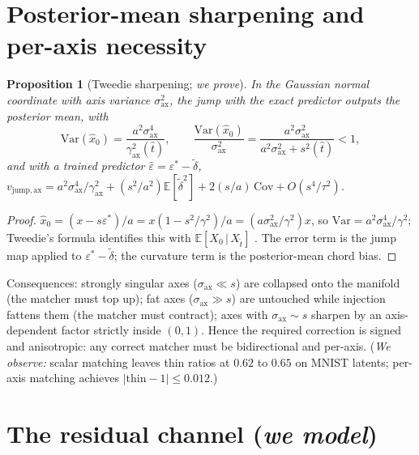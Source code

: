 \documentclass[11pt]{article}
\newtheorem{proposition}{Proposition}
\theoremstyle{remark}
\newcommand{\eps}{\varepsilon}
\newcommand{\epshat}{\hat\varepsilon}
\newcommand{\E}{\mathbb{E}}
\newcommand{\Var}{\mathrm{Var}}
\begin{document}
\section{Posterior-mean sharpening and per-axis necessity}\label{app:sharpening}

\begin{proposition}[Tweedie sharpening; \emph{we prove}]\label{prop:sharpening}
In the Gaussian normal coordinate with axis variance $\sigma^2_{\mathrm{ax}}$, the jump
with the exact predictor outputs the posterior mean, with
\[
\Var(\hat x_0)=\frac{a^2\sigma^4_{\mathrm{ax}}}{\gamma^2_{\mathrm{ax}}(\hat t)},\qquad
\frac{\Var(\hat x_0)}{\sigma^2_{\mathrm{ax}}}
=\frac{a^2\sigma^2_{\mathrm{ax}}}{a^2\sigma^2_{\mathrm{ax}}+s^2(\hat t)}<1 ,
\]
and with a trained predictor $\epshat=\eps^*-\tilde\delta$,
$v_{\mathrm{jump,ax}}=a^2\sigma^4_{\mathrm{ax}}/\gamma^2_{\mathrm{ax}}
+(s^2/a^2)\E[\tilde\delta^2]+2(s/a)\,\mathrm{Cov}+O(s^4/\tau^2)$.
\end{proposition}

\begin{proof}
$\hat x_0=(x-s\eps^*)/a=x(1-s^2/\gamma^2)/a=(a\sigma^2_{\mathrm{ax}}/\gamma^2)x$, so
$\Var=a^2\sigma^4_{\mathrm{ax}}/\gamma^2$; Tweedie's formula identifies this with
$\E[X_0\,|\,X_{\hat t}]$ \citep{efron2011tweedie}. The error term is the jump map
applied to $\eps^*-\tilde\delta$; the curvature term is the posterior-mean chord bias.
\end{proof}

Consequences: strongly singular axes ($\sigma_{\mathrm{ax}}\ll s$) are collapsed onto
the manifold (the matcher must top up); fat axes ($\sigma_{\mathrm{ax}}\gg s$) are
untouched while injection fattens them (the matcher must contract); axes with
$\sigma_{\mathrm{ax}}\sim s$ sharpen by an axis-dependent factor strictly inside
$(0,1)$. Hence the required correction is signed and anisotropic: any correct matcher
must be bidirectional and per-axis. (\emph{We observe:} scalar matching leaves
thin ratios at $0.62$ to $0.65$ on MNIST latents; per-axis matching achieves
$|\text{thin}-1|\le0.012$.)

\section{The residual channel (\emph{we model})}\label{app:residual}
\end{document}
